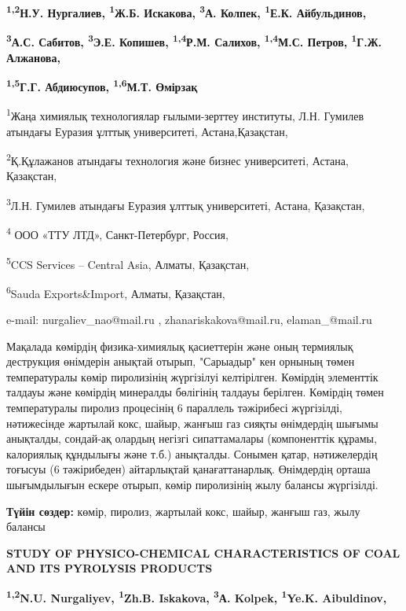 {\bfseries \textsuperscript{1,2}Н.У. Нургалиев, \textsuperscript{1}Ж.Б.
Искакова, \textsuperscript{3}А. Колпек, \textsuperscript{1}Е.К.
Айбульдинов,}

{\bfseries \textsuperscript{3}А.С. Сабитов, \textsuperscript{3}Э.Е.
Копишев, \textsuperscript{1,4}Р.М. Салихов, \textsuperscript{1,4}М.С.
Петров, \textsuperscript{1}Г.Ж. Алжанова,}

{\bfseries \textsuperscript{1,5}Г.Г. Абдиюсупов, \textsuperscript{1,6}М.Т.
Өмірзақ}

\textsuperscript{1}Жаңа химиялық технологиялар ғылыми-зерттеу институты,
Л.Н. Гумилев атындағы Еуразия ұлттық университеті, Астана,Қазақстан,

\textsuperscript{2}Қ.Құлажанов атындағы технология және бизнес
университеті, Астана, Қазақстан,

\textsuperscript{3}Л.Н. Гумилев атындағы Еуразия ұлттық университеті,
Астана, Қазақстан,

\textsuperscript{4} ООО «ТТУ ЛТД», Санкт-Петербург, Россия,

\textsuperscript{5}CCS Services -- Central Asia, Алматы, Қазақстан,

\textsuperscript{6}Sauda Exports\&Import, Алматы, Қазақстан,

e-mail: nurgaliev\_nao@mail.ru , zhanariskakova@mail.ru,
elaman\_@mail.ru

Мақалада көмірдің физика-химиялық қасиеттерін және оның термиялық
деструкция өнімдерін анықтай отырып, "Сарыадыр" кен орнының төмен
температуралы көмір пиролизінің жүргізілуі келтірілген. Көмірдің
элементтік талдауы және көмірдің минералды бөлігінің талдауы берілген.
Көмірдің төмен температуралы пиролиз процесінің 6 параллель тәжірибесі
жүргізілді, нәтижесінде жартылай кокс, шайыр, жанғыш газ сияқты
өнімдердің шығымы анықталды, сондай-ақ олардың негізгі сипаттамалары
(компоненттік құрамы, калориялық құндылығы және т.б.) анықталды. Сонымен
қатар, нәтижелердің тоғысуы (6 тәжірибеден) айтарлықтай қанағаттанарлық.
Өнімдердің орташа шығымдылығын ескере отырып, көмір пиролизінің жылу
балансы жүргізілді.

{\bfseries Түйін сөздер:} көмір, пиролиз, жартылай кокс, шайыр, жанғыш газ,
жылу балансы

{\bfseries STUDY OF PHYSICO-CHEMICAL CHARACTERISTICS OF COAL AND ITS
PYROLYSIS PRODUCTS}

{\bfseries \textsuperscript{1,2}N.U. Nurgaliyev, \textsuperscript{1}Zh.B.
Iskakova, \textsuperscript{3}А. Kolpek, \textsuperscript{1}Ye.K.
Aibuldinov,}

